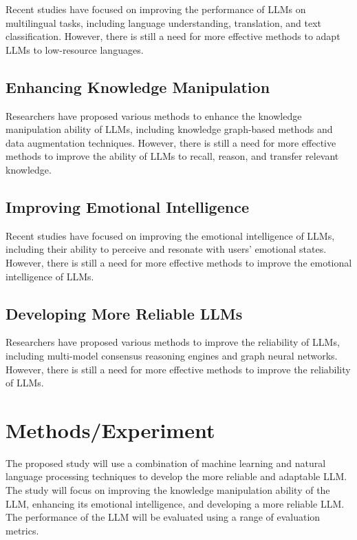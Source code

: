 \documentclass{article}
\begin{document}
Recent studies have focused on improving the performance of LLMs on multilingual tasks, including language understanding, translation, and text classification. However, there is still a need for more effective methods to adapt LLMs to low-resource languages.

\subsection{Enhancing Knowledge Manipulation}

Researchers have proposed various methods to enhance the knowledge manipulation ability of LLMs, including knowledge graph-based methods and data augmentation techniques. However, there is still a need for more effective methods to improve the ability of LLMs to recall, reason, and transfer relevant knowledge.

\subsection{Improving Emotional Intelligence}

Recent studies have focused on improving the emotional intelligence of LLMs, including their ability to perceive and resonate with users' emotional states. However, there is still a need for more effective methods to improve the emotional intelligence of LLMs.

\subsection{Developing More Reliable LLMs}

Researchers have proposed various methods to improve the reliability of LLMs, including multi-model consensus reasoning engines and graph neural networks. However, there is still a need for more effective methods to improve the reliability of LLMs.

\section{Methods/Experiment}

The proposed study will use a combination of machine learning and natural language processing techniques to develop the more reliable and adaptable LLM. The study will focus on improving the knowledge manipulation ability of the LLM, enhancing its emotional intelligence, and developing a more reliable LLM. The performance of the LLM will be evaluated using a range of evaluation metrics.
\end{document}
